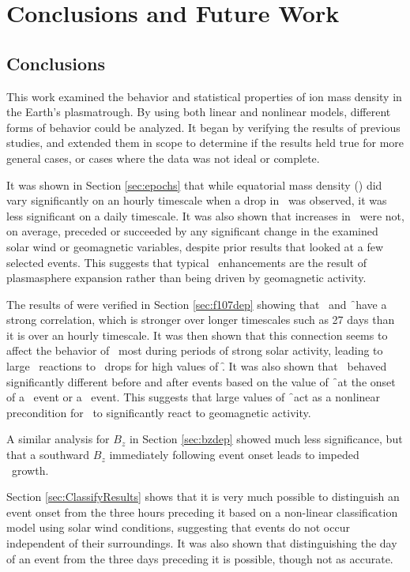 \chapter[Conclusions and Future Work]{Conclusions and Future Work}

\section{Conclusions}
This work examined the behavior and statistical properties of ion mass density in the Earth's plasmatrough. By using both linear and nonlinear models, different forms of behavior could be analyzed. It began by verifying the results of previous studies, and extended them in scope to determine if the results held true for more general cases, or cases where the data was not ideal or complete. 

It was shown in Section \ref{sec:epochs} that while equatorial mass density (\req) did vary significantly on an hourly timescale when a drop in \dst\ was observed, it was less significant on a daily timescale. It was also shown that increases in \req\ were not, on average, preceded or succeeded by any significant change in the examined solar wind or geomagnetic variables, despite prior results that looked at a few selected events.  This suggests that typical \req\ enhancements are the result of plasmasphere expansion rather than being driven by geomagnetic activity.

The results of \cite{Takahashi2010SolarCycleVariation} were verified in Section \ref{sec:f107dep} showing that \req\ and \f\ have a strong correlation, which is stronger over longer timescales such as 27 days than it is over an hourly timescale. It was then shown that this connection seems to affect the behavior of \req\ most during periods of strong solar activity, leading to large \req\ reactions to \dst\ drops for high values of \f.  It was also shown that \req\ behaved significantly different before and after events based on the value of \f\ at the onset of a \req\ event or a \dst\ event.  This suggests that large values of \f\ act as a nonlinear precondition for \req\ to significantly react to geomagnetic activity.

A similar analysis for $B_z$ in Section \ref{sec:bzdep} showed much less significance, but that a southward $B_z$ immediately following event onset leads to impeded \req\ growth.

Section \ref{sec:ClassifyResults} shows that it is very much possible to distinguish an event onset from the three hours preceding it based on a non-linear classification model using solar wind conditions, suggesting that events do not occur independent of their surroundings. It was also shown that distinguishing the day of an event from the three days preceding it is possible, though not as accurate.

